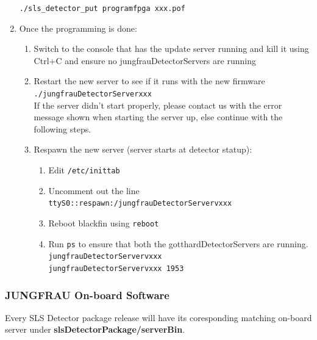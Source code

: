 \documentclass{article}
\begin{document}
\begin{enumerate}
\verb=./sls_detector_put programfpga xxx.pof= 
  \item Once the programming is done:
  \begin{enumerate}
    \item Switch to the console that has the update server running and kill it
using Ctrl+C and ensure no jungfrauDetectorServers are
running
    \item Restart the new server to see if it runs with the new firmware \\
\verb=./jungfrauDetectorServerxxx= \\
If the server didn't start properly, please contact us with the error message
shown when starting the server up, else continue with the following steps.
    \item Respawn the new server (server starts at detector statup): 
    \begin{enumerate}
      \item Edit \verb=/etc/inittab= 
      \item Uncomment out the line
\verb=ttyS0::respawn:/jungfrauDetectorServervxxx= 
      \item Reboot blackfin using \verb=reboot=
      \item Run \verb=ps= to ensure that both the gotthardDetectorServers are
running.\\
\verb=jungfrauDetectorServervxxx= \\
\verb=jungfrauDetectorServervxxx 1953=
    \end{enumerate}
  \end{enumerate}

\end{enumerate}



\subsubsection{JUNGFRAU On-board Software}
Every SLS Detector package release will have its coresponding matching on-board
server under \textbf{slsDetectorPackage/serverBin}.
\end{document}
